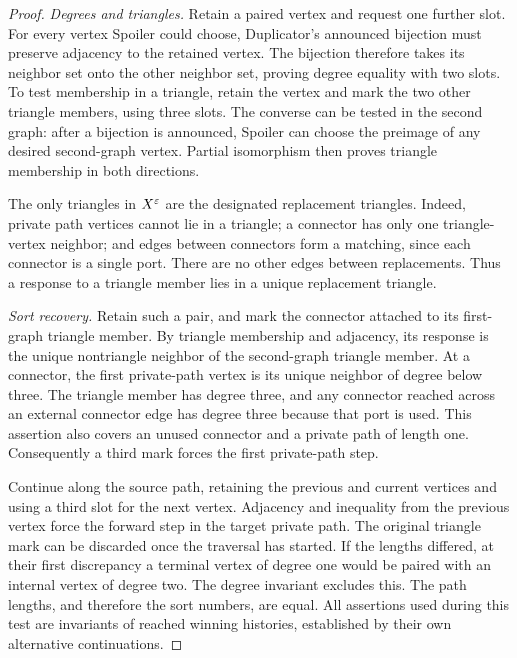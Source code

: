 \begin{proof}
\emph{Degrees and triangles.}
Retain a paired vertex and request one further slot.
For every vertex Spoiler could choose, Duplicator's announced
bijection must preserve adjacency to the retained vertex.
The bijection therefore takes its neighbor set onto the other
neighbor set, proving degree equality with two slots.
To test membership in a triangle, retain the vertex and mark the two
other triangle members, using three slots.
The converse can be tested in the second graph: after a bijection is
announced, Spoiler can choose the preimage of any desired
second-graph vertex.  Partial isomorphism then proves triangle
membership in both directions.

The only triangles in \(X^\varepsilon\) are the designated replacement
triangles.
Indeed, private path vertices cannot lie in a triangle; a connector
has only one triangle-vertex neighbor; and edges between connectors
form a matching, since each connector is a single port.
There are no other edges between replacements.
Thus a response to a triangle member lies in a unique replacement
triangle.

\emph{Sort recovery.}
Retain such a pair, and mark the connector attached to its
first-graph triangle member.
By triangle membership and adjacency, its response is the unique
nontriangle neighbor of the second-graph triangle member.
At a connector, the first private-path vertex is its unique neighbor
of degree below three.
The triangle member has degree three, and any connector reached
across an external connector edge has degree three because that port
is used.  This assertion also covers an unused connector and a
private path of length one.
Consequently a third mark forces the first private-path step.

Continue along the source path, retaining the previous and current
vertices and using a third slot for the next vertex.
Adjacency and inequality from the previous vertex force the forward
step in the target private path.
The original triangle mark can be discarded once the traversal has
started.
If the lengths differed, at their first discrepancy a terminal vertex
of degree one would be paired with an internal vertex of degree two.
The degree invariant excludes this.
The path lengths, and therefore the sort numbers, are equal.
All assertions used during this test are invariants of reached
winning histories, established by their own alternative continuations.


\end{proof}
